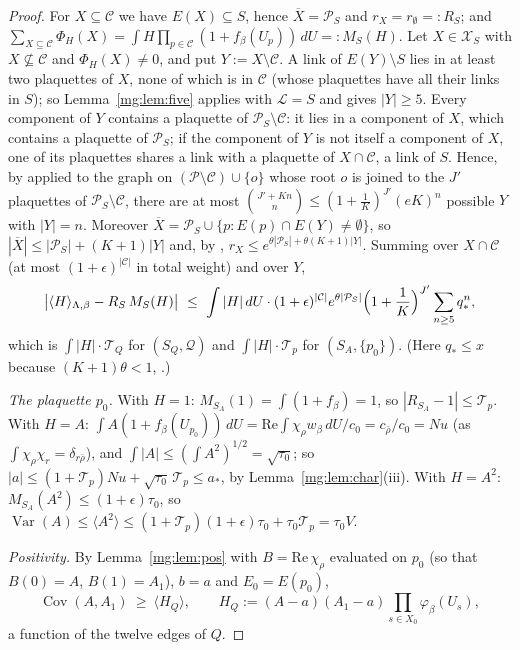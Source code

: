 \documentclass[11pt,a4paper]{article}
\theoremstyle{definition}
\theoremstyle{remark}
\DeclareMathOperator{\Cov}{Cov}
\DeclareMathOperator{\Var}{Var}
\newcommand{\cP}{\mathcal{P}}
\newcommand{\cX}{\mathcal{X}}
\newcommand{\dU}{\,dU}
\newcommand{\IIIref}[3]{\cite[#1~`#2' (\texttt{#3})]{III}}
\newcommand{\IIIlab}[2]{\cite[#1 \texttt{#2}]{III}}
\begin{document}
\begin{proof}
For $X\subseteq\mathcal C$ we have $E(X)\subseteq S$, hence $\overline X=\cP_S$ and $r_X=r_\emptyset=:R_S$; and $\sum_{X\subseteq\mathcal C}\Phi_H(X)=
\int H\prod_{p\in\mathcal C}(1+f_\beta(U_p))\dU=:M_S(H)$. Let $X\in\cX_S$ with $X\not\subseteq\mathcal C$ and $\Phi_H(X)\neq0$, and put
$Y:=X\setminus\mathcal C$. A link of $E(Y)\setminus S$ lies in at least two plaquettes of $X$, none of which is in $\mathcal C$ (whose plaquettes
have all their links in $S$); so Lemma~\ref{mg:lem:five} applies with $\mathcal L=S$ and gives $|Y|\ge5$. Every component of $Y$ contains a plaquette of
$\cP_S\setminus\mathcal C$: it lies in a component of $X$, which contains a plaquette of $\cP_S$; if the component of $Y$ is not itself a
component of $X$, one of its plaquettes shares a link with a plaquette of $X\cap\mathcal C$, a link of $S$. Hence, by
\IIIref{Lemma}{Rooted counting}{al:lem:rooted} applied to the graph on $(\cP\setminus\mathcal C)\cup\{o\}$ whose root $o$ is joined to the
$J'$ plaquettes of $\cP_S\setminus\mathcal C$, there are at most $\binom{J'+Kn}{n}\le(1+\frac1K)^{J'}(eK)^n$ possible $Y$ with $|Y|=n$. Moreover
$\overline X=\cP_S\cup\{p:E(p)\cap E(Y)\ne\emptyset\}$, so $|\overline X|\le|\cP_S|+(K+1)|Y|$ and, by \IIIref{Proposition}{Removing
plaquettes}{al:prop:remove}, $r_X\le e^{\theta|\cP_S|+\theta(K+1)|Y|}$. Summing over $X\cap\mathcal C$ (at most $(1+\epsilon)^{|\mathcal C|}$ in
total weight) and over $Y$,
\begin{equation}\label{mg:eq:local}
\bigl|\langle H\rangle_{\Lambda,\beta}-R_S\,M_S(H)\bigr|\ \le\ \int|H|\dU\cdot(1+\epsilon)^{|\mathcal C|}e^{\theta|\cP_S|}\Bigl(1+\frac1K\Bigr)^{J'}\sum_{n\ge5}q_*^n ,
\end{equation}
which is $\int|H|\cdot\mathcal T_Q$ for $(S_Q,\mathcal Q)$ and $\int|H|\cdot\mathcal T_p$ for $(S_A,\{p_0\})$. (Here $q_*\le x$ because $(K+1)\theta<1$,
\IIIlab{Lemma}{al:lem:constants}.)

\emph{The plaquette $p_0$.} With $H=1$: $M_{S_A}(1)=\int(1+f_\beta)=1$, so $|R_{S_A}-1|\le\mathcal T_p$. With $H=A$: $\int A(1+f_\beta(U_{p_0}))\dU=
\mathrm{Re}\int\chi_\rho w_\beta\dU/c_0=c_{\bar\rho}/c_0=Nu$ (as $\int\chi_\rho\chi_r=\delta_{r\bar\rho}$), and $\int|A|\le(\int A^2)^{1/2}=\sqrt{\tau_0}$; so
$|a|\le(1+\mathcal T_p)Nu+\sqrt{\tau_0}\,\mathcal T_p\le a_*$, by Lemma~\ref{mg:lem:char}(iii). With $H=A^2$: $M_{S_A}(A^2)\le(1+\epsilon)\tau_0$, so
$\Var(A)\le\langle A^2\rangle\le(1+\mathcal T_p)(1+\epsilon)\tau_0+\tau_0\mathcal T_p=\tau_0V$.

\emph{Positivity.} By Lemma~\ref{mg:lem:pos} with $B=\mathrm{Re}\,\chi_\rho$ evaluated on $p_0$ (so that $B(0)=A$, $B(1)=A_1$), $b=a$ and $E_0=E(p_0)$,
\[
\Cov(A,A_1)\ \ge\ \langle H_Q\rangle,\qquad H_Q:=(A-a)(A_1-a)\prod_{s\in X_0}\varphi_\beta(U_s),
\]
a function of the twelve edges of $Q$.


\end{proof}
\end{document}
